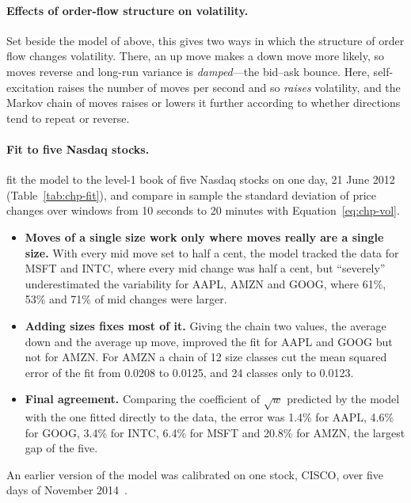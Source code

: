 \paragraph{Effects of order-flow structure on volatility.} Set beside the model of \citet{bacry2013} above, this gives two ways in which
the structure of order flow changes volatility. There, an up move makes a down move more likely, so moves
reverse and long-run variance is \emph{damped}---the bid--ask bounce. Here, self-excitation raises the number of
moves per second and so \emph{raises} volatility, and the Markov chain of moves raises or lowers it further
according to whether directions tend to repeat or reverse.

\paragraph{Fit to five Nasdaq stocks.} \citet{swishchuk2020gchp} fit the model to the level-1 book of five Nasdaq
stocks on one day, 21 June 2012 (Table~\ref{tab:chp-fit}), and compare in sample the standard deviation of price
changes over windows from 10 seconds to 20 minutes with Equation~\eqref{eq:chp-vol}.
\begin{itemize}[leftmargin=1.5em,itemsep=1pt]
\item \textbf{Moves of a single size work only where moves really are a single size.} With every mid move set to
  half a cent, the model tracked the data for MSFT and INTC, where every mid change was half a cent, but
  ``severely'' underestimated the variability for AAPL, AMZN and GOOG, where 61\%, 53\% and 71\% of mid changes
  were larger.
\item \textbf{Adding sizes fixes most of it.} Giving the chain two values, the average down and the average up
  move, improved the fit for AAPL and GOOG but not for AMZN. For AMZN a chain of 12 size classes cut the mean
  squared error of the fit from 0.0208 to 0.0125, and 24 classes only to 0.0123.
\item \textbf{Final agreement.} Comparing the coefficient of $\sqrt{w}$ predicted by the model with the one
  fitted directly to the data, the error was 1.4\% for AAPL, 4.6\% for GOOG, 3.4\% for INTC, 6.4\% for MSFT
  and 20.8\% for AMZN, the largest gap of the five.
\end{itemize}
An earlier version of the model was
calibrated on one stock, CISCO, over five days of November 2014~\citep{swishchuk2019chp}.

